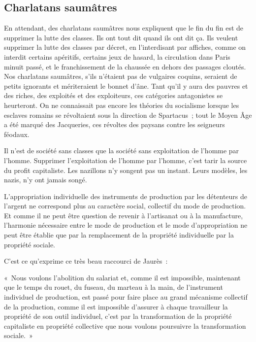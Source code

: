 \documentclass[french,twoside]{book} %
\newenvironment{quoteblock}%
  {\begin{quoting}}
  {\end{quoting}}
\newenvironment{quotebar}{%
    \def\FrameCommand{{\color{rubric!10!}\vrule width 0.5em} \hspace{0.9em}}%
    \def\OuterFrameSep{\itemsep} %
    \MakeFramed {\advance\hsize-\width \FrameRestore}
  }%
  {%
    \endMakeFramed
  }
\renewenvironment{quoteblock}%
  {%
    \savenotes
    \setstretch{0.9}
    \normalfont
    \begin{quotebar}
  }
  {%
    \end{quotebar}
    \spewnotes
  }
\begin{document}
\subsection[Charlatans saumâtres]{Charlatans saumâtres}
\noindent En attendant, des charlatans saumâtres nous expliquent que le fin du fin est de supprimer la lutte des classes. Ils ont tout dit quand ils ont dit ça. Ils veulent supprimer la lutte des classes par décret, en l’interdisant par affiches, comme on interdit certains apéritifs, certains jeux de hasard, la circulation dans Paris minuit passé, et le franchissement de la chaussée en dehors des passages cloutés. Nos charlatans saumâtres, s’ils n’étaient pas de vulgaires coquins, seraient de petits ignorants et mériteraient le bonnet d’âne. Tant qu’il y aura des pauvres et des riches, des exploités et des exploiteurs, ces catégories antagonistes se heurteront. On ne connaissait pas encore les théories du socialisme lorsque les esclaves romains se révoltaient sous la direction de Spartacus ; tout le Moyen Âge a été marqué des Jacqueries, ces révoltes des paysans contre les seigneurs féodaux.\par
Il n’est de société sans classes que la société sans exploitation de l’homme par l’homme. Supprimer l’exploitation de l’homme par l’homme, c’est tarir la source du profit capitaliste.   Les nazillons n’y songent pas un instant. Leurs modèles, les nazis, n’y ont jamais songé.\par
L’appropriation individuelle des instruments de production par les détenteurs de l’argent ne correspond plus au caractère social, collectif du mode de production. Et comme il ne peut être question de revenir à l’artisanat ou à la manufacture, l’harmonie nécessaire entre le mode de production et le mode d’appropriation ne peut être établie que par la remplacement de la propriété individuelle par la propriété sociale.\par
C’est ce qu’exprime ce très beau raccourci de Jaurès :\par

\begin{quoteblock}
 \noindent « Nous voulons l’abolition du salariat et, comme il est impossible, maintenant que le temps du rouet, du fuseau, du marteau à la main, de l’instrument individuel de production, est passé pour faire place au grand mécanisme collectif de la production, comme il est impossible d’assurer à chaque travailleur la propriété de son outil individuel, c’est par la transformation de la propriété capitaliste en propriété collective que nous voulons poursuivre la transformation sociale. »
 \end{quoteblock}
\end{document}
